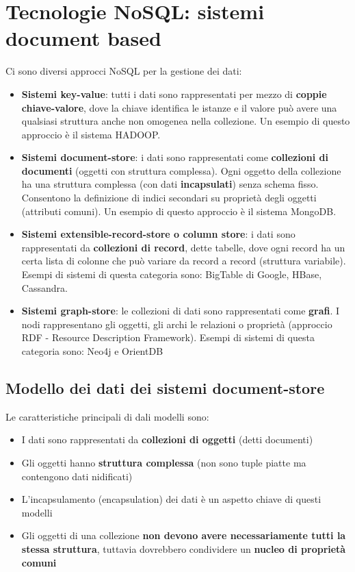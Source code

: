 \documentclass[a4paper,twoside]{article}
\begin{document}
\section{Tecnologie NoSQL: sistemi document based}
Ci sono diversi approcci NoSQL per la gestione dei dati:
\begin{itemize}
  \item \textbf{Sistemi key-value}: tutti i dati sono rappresentati per mezzo di
    \textbf{coppie chiave-valore}, dove la chiave identifica le istanze e il valore
    può avere una qualsiasi struttura anche non omogenea nella collezione. Un esempio
    di questo approccio è il sistema HADOOP.

  \item \textbf{Sistemi document-store}: i dati sono rappresentati come
    \textbf{collezioni di documenti} (oggetti con struttura complessa). Ogni oggetto
    della collezione ha una struttura complessa (con dati \textbf{incapsulati}) senza
    schema fisso. Consentono la definizione di indici secondari su proprietà degli oggetti
    (attributi comuni). Un esempio di questo approccio è il sistema MongoDB.

  \item \textbf{Sistemi extensible-record-store o column store}: i dati sono rappresentati
    da \textbf{collezioni di record}, dette tabelle, dove ogni record ha un certa lista
    di colonne che può variare da record a record (struttura variabile).
    Esempi di sistemi di questa categoria sono: BigTable di Google, HBase, Cassandra.

  \item \textbf{Sistemi graph-store}: le collezioni di dati sono rappresentati
    come \textbf{grafi}. I nodi rappresentano gli oggetti, gli archi le relazioni
    o proprietà (approccio RDF - Resource Description Framework).
    Esempi di sistemi di questa categoria sono: Neo4j e OrientDB
\end{itemize}

\subsection{Modello dei dati dei sistemi document-store}
Le caratteristiche principali di dali modelli sono:
\begin{itemize}
  \item I dati sono rappresentati da \textbf{collezioni di oggetti} (detti documenti)
  \item Gli oggetti hanno \textbf{struttura complessa} (non sono tuple piatte ma
    contengono dati nidificati)
  \item L'incapsulamento (encapsulation) dei dati è un aspetto chiave di questi modelli
  \item Gli oggetti di una collezione \textbf{non devono avere necessariamente tutti la
    stessa struttura}, tuttavia dovrebbero condividere un \textbf{nucleo di proprietà
    comuni}
\end{itemize}
\end{document}
